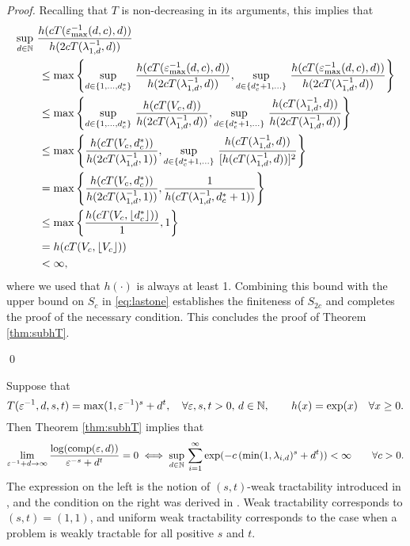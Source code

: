 \documentclass[sort&compress]{elsarticle}
\newcommand{\peter}[1]{\begingroup\color{violet}#1\endgroup}
\begin{document}
\begin{proof}
{Recalling that $T$ is non-decreasing in its arguments, this implies that
\begin{align*}
    \MoveEqLeft{\sup_{d\in\naturals} \,
		 \frac{ h(cT(\varepsilon^{-1}_{\max}(d,c),d))}{h(2cT(\lambda_{1,d}^{-1},d))}}\\
  &\le \max \left \{
  \sup_{d \in \{1, \ldots, d^*_c\}} \,
		 \frac{ h(cT(\varepsilon^{-1}_{\max}(d,c),d))}{h(2cT(\lambda_{1,d}^{-1},d))},
  \sup_{d\in \{d^*_c+1, \ldots \}} \,
		 \frac{ h(cT(\varepsilon^{-1}_{\max}(d,c),d))}{h(2cT(\lambda_{1,d}^{-1},d))}
  \right \} \\
  & \le \max \left \{
  \sup_{d \in \{1, \ldots, d^*_c\}}  \,
		 \frac{ h(cT(V_c,d))}{h(2cT(\lambda_{1,d}^{-1},d))}
  ,
  \sup_{d\in \{d^*_c+1, \ldots \}}  \,
		 \frac{ h(cT(\lambda_{1,d}^{-1},d))}{h(2cT(\lambda_{1,d}^{-1},d))}
  \right \}
  \\
  & \le \max \left \{
		 \frac{ h(cT(V_c,d^*_c))}{h(2cT(\lambda_{1,d}^{-1},1))},
  \sup_{d\in \{d^*_c+1, \ldots \}}  \,
		 \frac{ h(cT(\lambda_{1,d}^{-1},d))}{[h(cT(\lambda_{1,d}^{-1},d))]^2}
  \right \} \\
  & = \max \left \{
		 \frac{ h(cT(V_c,d^*_c))}{h(2cT(\lambda_{1,d}^{-1},1))},
		 \frac{1}{h(cT(\lambda_{1,d}^{-1},d_c^*+1))}
  \right \} \\
  & \le \max \left \{
		 \frac{ h(cT(V_c,\lfloor d^*_c \rfloor))}{1},
		 1
  \right \} \\
  & = h(cT(V_c,\lfloor V_c \rfloor))
		  \\
  & < \infty,
\end{align*}
where we used that $h(\cdot)$ is always at least 1. Combining this bound with the upper bound on $S_c$ in \eqref{eq:lastone} establishes the finiteness of $S_{2c}$ and completes the proof of the necessary condition.
This concludes the proof of Theorem \ref{thm:subhT}.
}

\qed
\end{proof}




\begin{example}
	Suppose that
	\[
	T(\varepsilon^{-1},d,s,t) = \max(1,\varepsilon^{-1})^s + d^t, \quad \forall \varepsilon,s,t > 0, \, d \in \mathbb{N}, \qquad h(x) = \exp(x) \quad \forall x \ge 0.
	\]
	Then Theorem \ref{thm:subhT} implies that
	\[\lim_{\varepsilon^{-1}+d\rightarrow \infty} \frac{\log( \operatorname{comp}(\varepsilon,d))}{\varepsilon^{-s}+d^t} = 0
	\iff
	 \sup_{d\in\mathbb{N}}  \, \sum_{i=1}^\infty \exp(-c\, (\min(1,\lambda_{i,d})^{s} + d^t )) <\infty \qquad \forall c > 0.
	\]
	The expression on the left is the notion of $(s,t)$-weak tractability \peter{introduced in \cite{SW15}}, and the condition on the right was derived in \peter{\cite[Theorem 3.1]{WW17}}.  Weak tractability corresponds to $(s,t)=(1,1)$, and uniform weak tractability corresponds to the case when a problem is weakly tractable for all positive $s$ and $t$.
\end{example}
\end{document}
